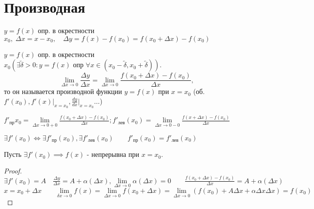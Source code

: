 \documentclass[../main.tex]{subfiles}
\begin{document}
\section{Производная}

$y=f(x)$ опр. в окрестности $x_{0},\;\Delta x=x-x_{0},\quad \Delta y=f(x)-f(x_{0})=f(x_{0}+\Delta x)-f(x_{0})$

\begin{definition}
    $y=f(x)$ опр. в окрестности $x_{0}(\exists \tilde{\delta}>0:y=f(x)\text{ опр }\forall x \in(x_{0}-\tilde{\delta},x_{0}+\tilde{\delta}))$. 
    \[\lim\limits_{\Delta x\to 0} \frac{\Delta y}{\Delta x}=\lim\limits_{\Delta x\to 0} \frac{f(x_{0}+\Delta x)-f(x_{0})}{\Delta x},\] то он называется производной функции $y=f(x)$ при $x=x_{0}$ (об. $f'(x_{0}),f'(x)\bigg|_{x=x_{0}},\frac{dy}{dx}\bigg|_{x=x_{0}}\dots$)
    
    $f'_{пр}x_{0}=\lim\limits_{\Delta x\to 0+0}\frac{f(x_{0}+\Delta x)-f(x_{0})}{\Delta x};f'_{лев}(x_{0})=\lim\limits_{\Delta x\to 0-0}\frac{f(x+\Delta x)-f(x_{0})}{\Delta x}$

    $\exists f'(x_{0}) \Leftrightarrow \exists f'_{пр}(x_{0}),\exists f'_{лев}(x_{0})\qquad f'_{пр}(x_{0})=f'_{лев}(x_0)$

\end{definition}

\begin{theorem}
    Пусть $\exists f'(x_{0})\implies f(x)$ - непрерывна при $x=x_{0}$.
\end{theorem}
\begin{proof}
    $\exists f'(x_{0})=A \quad \frac{\Delta y}{\Delta x}=A+\alpha(\Delta x), \lim\limits_{\Delta x\to 0} \alpha(\Delta x) = 0\qquad \frac{f(x_{0}+\Delta x)-f(x_{0})}{\Delta x}=A+\alpha(\Delta x)$
    $x=x_{0}+\Delta x\qquad \lim\limits_{\delta x\to 0} f(x)=\lim\limits_{\Delta x\to 0} f(x_{0}+\Delta x)=\lim\limits_{\Delta x\to 0} \left(f(x_{0})+A\Delta x + \alpha \Delta x \Delta x \right)=f(x_{0})$
\end{proof}
\end{document}
